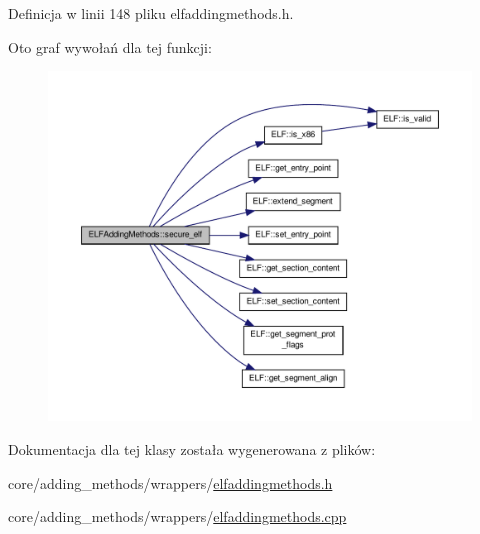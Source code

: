 Definicja w linii 148 pliku elfaddingmethods.\-h.



Oto graf wywołań dla tej funkcji\-:\nopagebreak
\begin{figure}[H]
\begin{center}
\leavevmode
\includegraphics[width=350pt]{class_e_l_f_adding_methods_acaa41aa5ab101bb4fa0e23a3029020ad_cgraph}
\end{center}
\end{figure}




Dokumentacja dla tej klasy została wygenerowana z plików\-:\begin{DoxyCompactItemize}
\item 
core/adding\-\_\-methods/wrappers/\hyperlink{elfaddingmethods_8h}{elfaddingmethods.\-h}\item 
core/adding\-\_\-methods/wrappers/\hyperlink{elfaddingmethods_8cpp}{elfaddingmethods.\-cpp}\end{DoxyCompactItemize}
